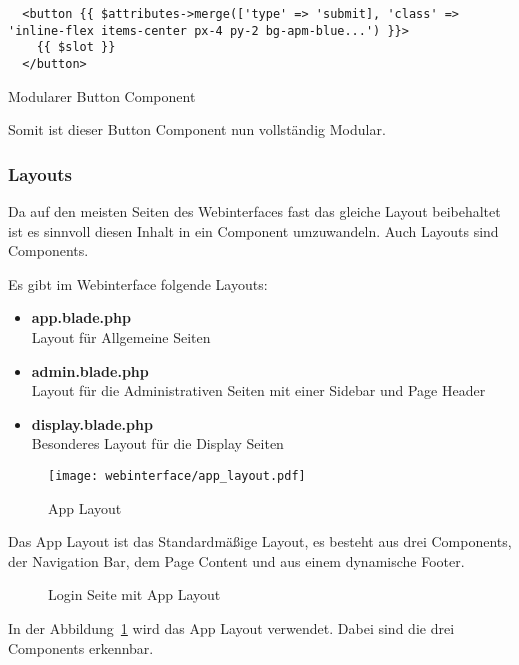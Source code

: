 \begin{listing}[H]
  \begin{verbatim}
  <button {{ $attributes->merge(['type' => 'submit], 'class' => 'inline-flex items-center px-4 py-2 bg-apm-blue...') }}>
    {{ $slot }}
  </button>
  \end{verbatim}
  \caption{Modularer Button Component}
\end{listing}

Somit ist dieser Button Component nun vollständig Modular.


\subsubsection{Layouts}

Da auf den meisten Seiten des Webinterfaces fast das gleiche Layout beibehaltet
ist es sinnvoll diesen Inhalt in ein Component umzuwandeln. Auch Layouts sind
Components.

Es gibt im Webinterface folgende Layouts:

\begin{itemize}
  \item \textbf{app.blade.php}\\
  Layout für Allgemeine Seiten
  \item \textbf{admin.blade.php}\\
  Layout für die Administrativen Seiten mit einer Sidebar und Page Header
  \item \textbf{display.blade.php}\\
  Besonderes Layout für die Display Seiten
\end{itemize}

\begin{figure}[H]
  \centering
  \texttt{[image: webinterface/app\_layout.pdf]}
  \caption{App Layout}
\end{figure}

Das App Layout ist das Standardmäßige Layout, es besteht aus drei Components,
der Navigation Bar, dem Page Content und aus einem dynamische Footer.

\begin{figure}[H]
  \centering
  \caption{Login Seite mit App Layout}
  \label{fig:login_site}
\end{figure}

In der Abbildung~\ref{fig:login_site} wird das App Layout verwendet. Dabei sind
die drei Components erkennbar.

